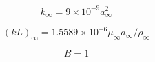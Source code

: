 {\newpage\clearpage
{}%
\begin{displaymath}
k_{\infty} = 9 \times 10^{-9} a_{\infty}^2
\end{displaymath}%
\lthtmldisplayZ
\lthtmlcheckvsize\clearpage}

{\newpage\clearpage
{}%
\begin{displaymath}
(kL)_{\infty} = 1.5589 \times 10^{-6} \mu_{\infty}a_{\infty}/\rho_{\infty}
\end{displaymath}%
\lthtmldisplayZ
\lthtmlcheckvsize\clearpage}

{\newpage\clearpage
{}%
\begin{displaymath}
B=1
\end{displaymath}%
\lthtmldisplayZ
\lthtmlcheckvsize\clearpage}



